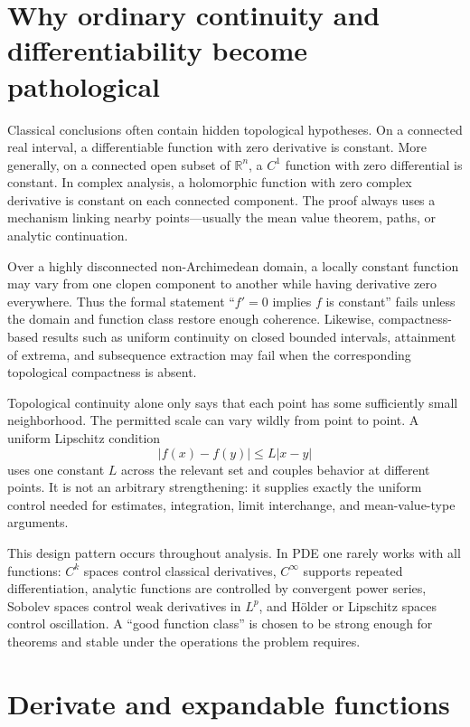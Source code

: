 \documentclass[11pt,a4paper]{article}
\theoremstyle{remark}
\newcommand{\R}{\mathbb R}
\begin{document}
\section{Why ordinary continuity and differentiability become pathological}

Classical conclusions often contain hidden topological hypotheses. On a connected real interval,
a differentiable function with zero derivative is constant. More generally, on a connected open
subset of $\R^n$, a $C^1$ function with zero differential is constant. In complex analysis, a
holomorphic function with zero complex derivative is constant on each connected component. The
proof always uses a mechanism linking nearby points---usually the mean value theorem, paths, or
analytic continuation.

Over a highly disconnected non-Archimedean domain, a locally constant function may vary from one
clopen component to another while having derivative zero everywhere. Thus the formal statement
``$f'=0$ implies $f$ is constant'' fails unless the domain and function class restore enough
coherence. Likewise, compactness-based results such as uniform continuity on closed bounded
intervals, attainment of extrema, and subsequence extraction may fail when the corresponding
topological compactness is absent.

Topological continuity alone only says that each point has some sufficiently small neighborhood.
The permitted scale can vary wildly from point to point. A uniform Lipschitz condition
\[
|f(x)-f(y)|\le L|x-y|
\]
uses one constant $L$ across the relevant set and couples behavior at different points. It is not
an arbitrary strengthening: it supplies exactly the uniform control needed for estimates,
integration, limit interchange, and mean-value-type arguments.

This design pattern occurs throughout analysis. In PDE one rarely works with all functions:
$C^k$ spaces control classical derivatives, $C^\infty$ supports repeated differentiation,
analytic functions are controlled by convergent power series, Sobolev spaces control weak
derivatives in $L^p$, and H\"older or Lipschitz spaces control oscillation. A ``good function
class'' is chosen to be strong enough for theorems and stable under the operations the problem
requires.

\section{Derivate and expandable functions}
\end{document}
